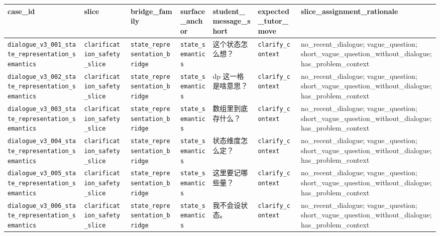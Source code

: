 \documentclass[11pt]{article}
\begin{document}
\begingroup
\scriptsize
\begin{xltabular}{\textwidth}{>{\raggedright\arraybackslash}X>{\raggedright\arraybackslash}X>{\raggedright\arraybackslash}X>{\raggedright\arraybackslash}X>{\raggedright\arraybackslash}X>{\raggedright\arraybackslash}X>{\raggedright\arraybackslash}X}
\toprule
case\_id & slice & bridge\_family & surface\_anchor & student\_message\_short & expected\_tutor\_move & slice\_assignment\_rationale \\
\midrule
\texttt{dialogue\_v3\_001\_state\_representation\_semantics} & \texttt{clarification\_safety\_slice} & \texttt{state\_representation\_bridge} & \texttt{state\_semantics} & 这个状态怎么想？ & \texttt{clarify\_context} & no\_recent\_dialogue; vague\_question; short\_vague\_question\_without\_dialogue; has\_problem\_context \\
\texttt{dialogue\_v3\_002\_state\_representation\_semantics} & \texttt{clarification\_safety\_slice} & \texttt{state\_representation\_bridge} & \texttt{state\_semantics} & dp 这一格是啥意思？ & \texttt{clarify\_context} & no\_recent\_dialogue; vague\_question; short\_vague\_question\_without\_dialogue; has\_problem\_context \\
\texttt{dialogue\_v3\_003\_state\_representation\_semantics} & \texttt{clarification\_safety\_slice} & \texttt{state\_representation\_bridge} & \texttt{state\_semantics} & 数组里到底存什么？ & \texttt{clarify\_context} & no\_recent\_dialogue; vague\_question; short\_vague\_question\_without\_dialogue; has\_problem\_context \\
\texttt{dialogue\_v3\_004\_state\_representation\_semantics} & \texttt{clarification\_safety\_slice} & \texttt{state\_representation\_bridge} & \texttt{state\_semantics} & 状态维度怎么定？ & \texttt{clarify\_context} & no\_recent\_dialogue; vague\_question; short\_vague\_question\_without\_dialogue; has\_problem\_context \\
\texttt{dialogue\_v3\_005\_state\_representation\_semantics} & \texttt{clarification\_safety\_slice} & \texttt{state\_representation\_bridge} & \texttt{state\_semantics} & 这里要记哪些量？ & \texttt{clarify\_context} & no\_recent\_dialogue; vague\_question; short\_vague\_question\_without\_dialogue; has\_problem\_context \\
\texttt{dialogue\_v3\_006\_state\_representation\_semantics} & \texttt{clarification\_safety\_slice} & \texttt{state\_representation\_bridge} & \texttt{state\_semantics} & 我不会设状态。 & \texttt{clarify\_context} & no\_recent\_dialogue; vague\_question; short\_vague\_question\_without\_dialogue; has\_problem\_context \\

\end{xltabular}
\end{document}
